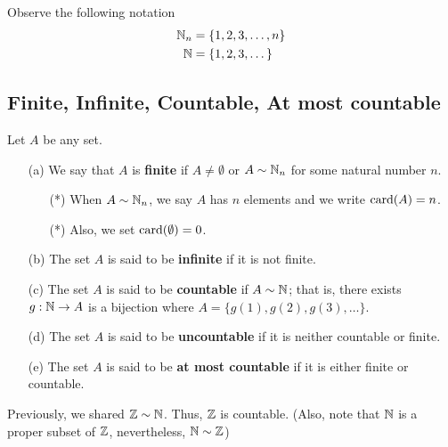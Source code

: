 \documentclass[a4paper]{report}
\begin{document}
Observe the following notation
\begin{align*}
    {\ensuremath{\mathbb{N}}}_{n} &= \{ 1,2,3, \dots, n  \}  \\
    \mathbb{N} &= \{ 1,2,3,\dots  \} 
\end{align*}

\subsection{Finite, Infinite, Countable, At most countable}

\begin{definition}
    Let \( A  \) be any set.
    \begin{enumerate}
        \item[(a)] We say that \( A  \) is \textbf{finite} if \( A \neq \emptyset  \) or \( A \sim {\ensuremath{\mathbb{N}}}_{n} \) for some natural number \( n  \).
            \begin{itemize}
            \item[(*)] When \( A \sim {\ensuremath{\mathbb{N}}}_{n} \), we say \( A  \) has \( n  \) elements and we write \( \operatorname{card}(A) = n \).
            \item[(*)] Also, we set \( \operatorname{card}(\emptyset) = 0 \).
            \end{itemize}
        \item[(b)] The set \( A  \) is said to be \textbf{infinite} if it is not finite.
        \item[(c)] The set \(  A \) is said to be \textbf{countable} if \( A \sim \mathbb{N}  \); that is, there exists \( g: \mathbb{N} \to A  \) is a bijection where \( A = \{ g(1), g(2), g(3), \dots  \}  \).
        \item[(d)] The set \( A  \) is said to be \textbf{uncountable} if it is neither countable or finite. 
        \item[(e)] The set \( A  \) is said to be \textbf{at most countable} if it is either finite or countable.
    \end{enumerate}
\end{definition}

\begin{remark}
   Previously, we shared \( \mathbb{Z} \sim \mathbb{N}  \). Thus, \( \mathbb{Z}  \) is countable. (Also, note that \( \mathbb{N}  \) is a proper subset of \( \mathbb{Z}  \), nevertheless, \( \mathbb{N} \sim \mathbb{Z}  \)) 
\end{remark}
\end{document}
